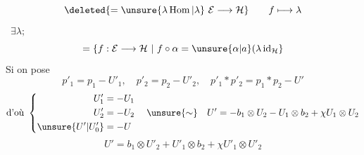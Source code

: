 \[
\deleted{=\unsure{\lambda\operatorname{Hom}|\lambda}\ \mathcal E\longrightarrow\mathcal H}
\qquad f\longmapsto\lambda
\]
\ \(\exists\lambda;\)
\[
=\left\{f:\mathcal E\longrightarrow\mathcal H\ \middle|\ 
f\circ\alpha=\unsure{\alpha|a}(\lambda\,\mathrm{id}_{\mathcal H}\right\}
\]
Si on pose
\[
p'_1=p_1-U'_1,\quad p'_2=p_2-U'_2,\quad
p'_1*p'_2=p_1*p_2-U'
\]
\[
\text{d'où }\left\{\begin{aligned}
U'_1&=-U_1\\
U'_2&=-U_2\\
\unsure{U'|U'_0}&=-U
\end{aligned}\right.
\quad\unsure{\sim}\quad
U'=-b_1\otimes U_2-U_1\otimes b_2+\chi U_1\otimes U_2
\]
\[
\boxed{U'=b_1\otimes U'_2+U'_1\otimes b_2+\chi U'_1\otimes U'_2}
\]
